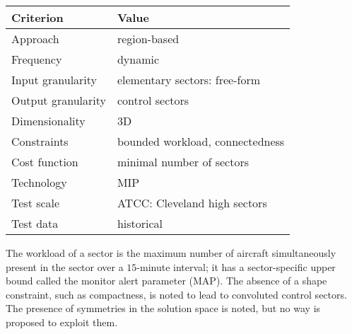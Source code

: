 \documentclass[a4paper,12pt]{article}
\begin{document}
\begin{center}
\begin{tabular}{|l|l|}
  \hline
  Criterion & Value \\
  \hline\hline
  Approach & region-based \\ \hline
  Frequency & dynamic \\ \hline
  Input granularity & elementary sectors: free-form \\ \hline
  Output granularity & control sectors \\ \hline
  Dimensionality & 3D \\ \hline
  Constraints & bounded workload, connectedness \\ \hline
  Cost function & minimal number of sectors \\ \hline
  Technology & MIP \\ \hline
  Test scale & ATCC: Cleveland high sectors \\ \hline
  Test data & historical \\ \hline
\end{tabular}
\end{center}
The workload of a sector is the maximum number of aircraft
simultaneously present in the sector over a $15$-minute interval; it
has a sector-specific upper bound called the monitor alert parameter
(MAP).  The absence of a shape constraint, such as compactness, is
noted to lead to convoluted control sectors.  The presence of
symmetries in the solution space is noted, but no way is proposed to
exploit them.

\subsection{\cite{Leiden:ATIO09}}
\end{document}
